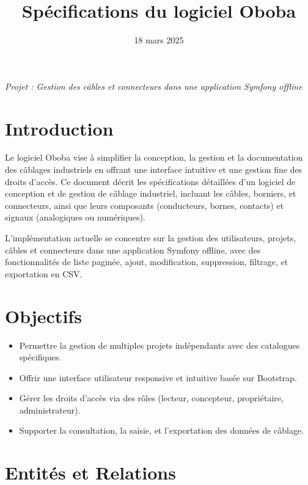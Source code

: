 \documentclass[a4paper,12pt]{article}
\title{Spécifications du logiciel Oboba}
\author{}
\date{18 mars 2025}
\begin{document}
\maketitle

\begin{center}
    \textit{Projet : Gestion des câbles et connecteurs dans une application Symfony offline}
\end{center}

\tableofcontents
\newpage

\section{Introduction}
Le logiciel Oboba vise à simplifier la conception, la gestion et la documentation des câblages industriels en offrant une interface intuitive et une gestion fine des droits d’accès. Ce document décrit les spécifications détaillées d’un logiciel de conception et de gestion de câblage industriel, incluant les câbles, borniers, et connecteurs, ainsi que leurs composants (conducteurs, bornes, contacts) et signaux (analogiques ou numériques).

L’implémentation actuelle se concentre sur la gestion des utilisateurs, projets, câbles et connecteurs dans une application Symfony offline, avec des fonctionnalités de liste paginée, ajout, modification, suppression, filtrage, et exportation en CSV.

\section{Objectifs}
\begin{itemize}
    \item Permettre la gestion de multiples projets indépendants avec des catalogues spécifiques.
    \item Offrir une interface utilisateur responsive et intuitive basée sur Bootstrap.
    \item Gérer les droits d’accès via des rôles (lecteur, concepteur, propriétaire, administrateur).
    \item Supporter la consultation, la saisie, et l’exportation des données de câblage.
\end{itemize}

\section{Entités et Relations}
\end{document}
